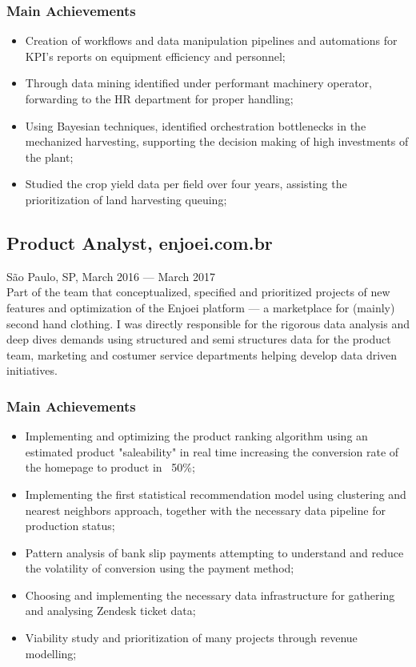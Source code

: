 \documentclass{article}
\newcommand{\jobdate}[3]{
\large
\vspace{0.05em} 
  {#1, #2 --- #3}
\vspace{0.5em} 
\\
}
\begin{document}
\subsubsection{Main Achievements}

\begin{itemize}
\item{Creation of workflows and data manipulation pipelines and automations for KPI's reports on equipment efficiency and personnel;}
\item{Through data mining identified under performant machinery operator, forwarding to the HR department for proper handling;}
\item{Using Bayesian techniques, identified orchestration bottlenecks in the mechanized harvesting, supporting the decision making of high investments of the plant;}
\item{Studied the crop yield data per field over four years, assisting the prioritization of land harvesting queuing;}
\end{itemize}

\subsection{Product Analyst, enjoei.com.br}
\jobdate{São Paulo, SP}{March 2016}{March 2017}
Part of the team that conceptualized, specified and prioritized projects of new features and optimization of the Enjoei platform --- a marketplace for (mainly) second hand clothing. I was directly responsible for the rigorous data analysis and deep dives demands using structured and semi structures data for the product team, marketing and costumer service departments helping develop data driven initiatives.
\subsubsection{Main Achievements}

\begin{itemize}

\item{Implementing and optimizing the product ranking algorithm using an estimated product "saleability" in real time increasing the conversion rate of the homepage to product in ~50\%;}
\item{Implementing the first statistical recommendation model using clustering and nearest neighbors approach, together with the necessary data pipeline for production status;}
\item{Pattern analysis of bank slip payments attempting to understand and reduce the volatility of conversion using the payment method;}
\item{Choosing and implementing the necessary data infrastructure for gathering and analysing Zendesk ticket data;}
\item{Viability study and prioritization of many projects through revenue modelling;}
\end{itemize}
\end{document}
